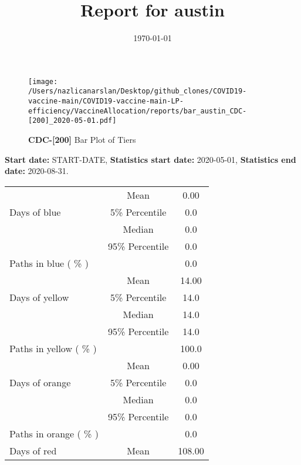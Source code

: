 \documentclass{article}
\title{Report for austin}
\author{}
\date{\today}
\begin{document}
\begin{figure}[!htb]
  \centering
   \texttt{[image: /Users/nazlicanarslan/Desktop/github\_clones/COVID19-vaccine-main/COVID19-vaccine-main-LP-efficiency/VaccineAllocation/reports/bar\_austin\_CDC-[200]\_2020-05-01.pdf]}
   \caption{\textbf{CDC-[200]} Bar Plot of Tiers}
      \label{fig:IHT}
\end{figure}
 \textbf{Start date:} START-DATE,	
\textbf{Statistics start date:} 2020-05-01,
\textbf{Statistics end date:} 2020-08-31.
\begin{table}[!htb]
	\centering
	\begin{tabular}{p{4cm}cc}
		\toprule
		\multirow{3}{*}{Days of blue} & Mean      & 0.00                     \\ \cmidrule(l){2-3} 
		& 5\% Percentile    & 0.0                      \\ \cmidrule(l){2-3} 
		& Median    & 0.0                     \\ \cmidrule(l){2-3} 
		& 95\% Percentile    & 0.0                          \\ \midrule 
		\multirow{1}{*}{Paths in blue ( \% )} &      &         0.0                \\   \midrule
		\multirow{3}{*}{Days of yellow} & Mean      & 14.00                       \\ \cmidrule(l){2-3} 
		& 5\% Percentile    & 14.0                      \\ \cmidrule(l){2-3} 
		& Median    & 14.0                     \\ \cmidrule(l){2-3} 
		& 95\% Percentile    & 14.0                     \\ \midrule    
		\multirow{1}{*}{Paths in yellow ( \% )} &      &         100.0           \\   \midrule
		\multirow{3}{*}{Days of orange} & Mean      & 0.00                    \\ \cmidrule(l){2-3} 
		& 5\% Percentile    & 0.0                      \\ \cmidrule(l){2-3} 
		& Median    & 0.0                    \\ \cmidrule(l){2-3} 
		& 95\% Percentile    & 0.0                      \\ \midrule    
		\multirow{1}{*}{Paths in orange ( \% )} &      &         0.0              \\   \midrule
		\multirow{3}{*}{Days of red} & Mean      & 108.00                        \\ \cmidrule(l){2-3} 

\end{tabular}
\end{table}
\end{document}
